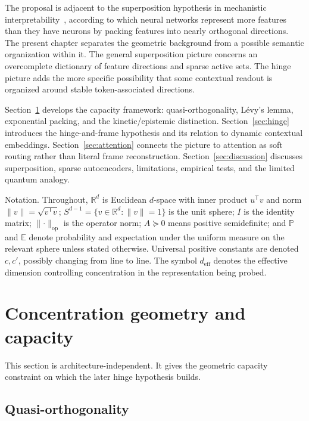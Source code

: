 \documentclass[
  aps,
  reprint,
  superscriptaddress,
  floatfix,
  nofootinbib,
  longbibliography
]{revtex4-2}
\newcommand{\R}{\mathbb{R}}
\newcommand{\E}{\mathbb{E}}
\newcommand{\Prob}{\mathbb{P}}
\newcommand{\Sph}[1]{S^{#1}}
\newcommand{\deff}{d_{\mathrm{eff}}}
\newcommand{\T}{^{\mathsf{T}}}
\newcommand{\opnorm}[1]{\lVert #1 \rVert_{\mathrm{op}}}
\newcommand{\norm}[1]{\lVert #1 \rVert}
\begin{document}
The proposal is adjacent to the superposition hypothesis in mechanistic
interpretability~\cite{elhage2022superposition}, according to which neural networks
represent more features than they have neurons by packing features into
nearly orthogonal directions. The present chapter separates the
geometric background from a possible semantic organization within it.
The general superposition picture concerns an overcomplete dictionary
of feature directions and sparse active sets. The hinge picture adds
the more specific possibility that some contextual readout is organized
around stable token-associated directions.

Section~\ref{sec:concentration} develops the capacity framework:
quasi-orthogonality, L\'evy's lemma, exponential packing, and the
kinetic/epistemic distinction. Section~\ref{sec:hinge} introduces the
hinge-and-frame hypothesis and its relation to dynamic contextual
embeddings. Section~\ref{sec:attention} connects the picture to
attention as soft routing rather than literal frame reconstruction.
Section~\ref{sec:discussion} discusses superposition, sparse
autoencoders, limitations, empirical tests, and the limited quantum
analogy.

{Notation.}
Throughout, $\R^{d}$ is Euclidean $d$-space with inner product $u\T v$
and norm $\norm{v}=\sqrt{v\T v}$; $\Sph{d-1}=\{v\in\R^{d}:\norm{v}=1\}$
is the unit sphere; $I$ is the identity matrix; $\opnorm{\cdot}$ is the
operator norm; $A\succeq0$ means positive semidefinite; and $\Prob$ and
$\E$ denote probability and expectation under the uniform measure on
the relevant sphere unless stated otherwise. Universal positive
constants are denoted $c,c'$, possibly changing from line to line.
The symbol $\deff$ denotes the effective dimension controlling
concentration in the representation being probed.

\section{Concentration geometry and capacity}
\label{sec:concentration}

This section is architecture-independent. It gives the geometric
capacity constraint on which the later hinge hypothesis builds.

\subsection{Quasi-orthogonality}
\label{sec:quasiortho}
\end{document}
